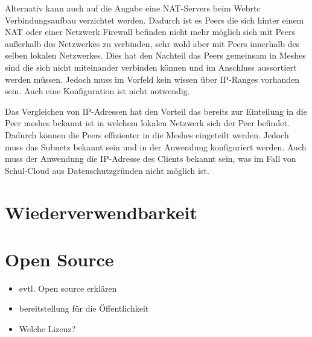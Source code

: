 Alternativ kann auch auf die Angabe eine NAT-Servers beim Webrtc Verbindungsaufbau verzichtet werden. Dadurch ist es Peers die sich hinter einem NAT oder einer Netzwerk Firewall befinden nicht mehr möglich sich mit Peers außerhalb des Netzwerkes zu verbinden, sehr wohl aber mit Peers innerhalb des selben lokalen Netzwerkes. Dies hat den Nachteil das Peers gemeinsam in Meshes sind die sich nicht miteinander verbinden können und im Anschluss aussortiert werden müssen. Jedoch muss im Vorfeld kein wissen über IP-Ranges vorhanden sein. Auch eine Konfiguration ist nicht notwendig. 

Das Vergleichen von IP-Adressen hat den Vorteil das bereits zur Einteilung in die Peer meshes bekannt ist in welchem lokalen Netzwerk sich der Peer befindet. Dadurch können die Peers effizienter in die Meshes eingeteilt werden. Jedoch muss das Subnetz bekannt sein und in der Anwendung konfiguriert werden. Auch muss der Anwendung die IP-Adresse des Clients bekannt sein, was im Fall von Schul-Cloud aus Datenschutzgründen nicht möglich ist.

\section{Wiederverwendbarkeit}
\section{Open Source}
\begin{itemize}
	\item evtl. Open source erklären
	\item bereitstellung für die Öffentlichkeit
	\item Welche Lizenz?
\end{itemize}
%

